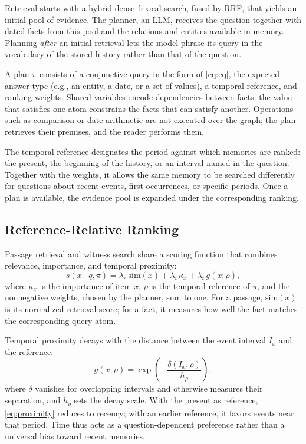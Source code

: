 Retrieval starts with a hybrid dense--lexical search, fused by
\ac{RRF}, that yields an initial pool of evidence. The planner, an
\ac{LLM}, receives the question together with dated facts from this pool
and the relations and entities available in memory. Planning
\emph{after} an initial retrieval lets the model phrase its query in the
vocabulary of the stored history rather than that of the question.

A plan $\pi$ consists of a conjunctive query in the form of \cref{eq:cq},
the expected answer type (e.g., an entity, a date, or a set of values),
a temporal reference, and ranking weights. Shared variables encode
dependencies between facts: the value that satisfies one atom constrains
the facts that can satisfy another. Operations such as comparison or
date arithmetic are not executed over the graph; the plan retrieves
their premises, and the reader performs them.

The temporal reference designates the period against which memories are
ranked: the present, the beginning of the history, or an interval named
in the question. Together with the weights, it allows the same memory to
be searched differently for questions about recent events, first
occurrences, or specific periods. Once a plan is available, the evidence
pool is expanded under the corresponding ranking.

\subsection{Reference-Relative Ranking}
\label{sec:method-score}

Passage retrieval and witness search share a scoring function that
combines relevance, importance, and temporal proximity:
\begin{equation}
 s(x\mid q,\pi)=
 \lambda_s\,\mathrm{sim}(x)
 +\lambda_i\,\kappa_x
 +\lambda_t\,g(x;\rho),
 \label{eq:score}
\end{equation}
where $\kappa_x$ is the importance of item $x$, $\rho$ is the temporal
reference of $\pi$, and the nonnegative weights, chosen by the planner,
sum to one. For a passage, $\mathrm{sim}(x)$ is its normalized retrieval
score; for a fact, it measures how well the fact matches the
corresponding query atom.

Temporal proximity decays with the distance between the event interval
$I_x$ and the reference:
\begin{equation}
 g(x;\rho)=\exp\!\left(-\frac{\delta(I_x,\rho)}{h_\rho}\right),
 \label{eq:proximity}
\end{equation}
where $\delta$ vanishes for overlapping intervals and otherwise measures
their separation, and $h_\rho$ sets the decay scale. With the present as
reference, \cref{eq:proximity} reduces to recency; with an earlier
reference, it favors events near that period. Time thus acts as a
question-dependent preference rather than a universal bias toward recent
memories.

